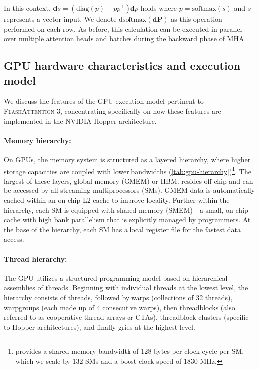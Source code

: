 \begin{enumerate}
In this context, $\mathbf{d}s = (\mathrm{diag}(p) - p p^\top)\mathbf{d}p$ holds where $p = \mathrm{softmax}(s)$ and $s$ represents a vector input. We denote $\mathrm{dsoftmax}(\mathbf{dP})$ as this operation performed on each row. As before, this calculation can be executed in parallel over multiple attention heads and batches during the backward phase of MHA.

\subsection{GPU hardware characteristics and execution model}
\label{subsec:hardware}

We discuss the features of the GPU execution model pertinent to \textsc{FlashAttention-3}, concentrating specifically on how these features are implemented in the NVIDIA Hopper architecture.

\paragraph{Memory hierarchy:} On GPUs, the memory system is structured as a layered hierarchy, where higher storage capacities are coupled with lower bandwidths (\cref{tab:gpu-hierarchy})\footnote{\citet{luo2024benchmarking} provides a shared memory bandwidth of 128 bytes per clock cycle per SM, which we scale by 132 SMs and a boost clock speed of 1830 MHz.}. The largest of these layers, global memory (GMEM) or HBM, resides off-chip and can be accessed by all streaming multiprocessors (SMs). GMEM data is automatically cached within an on-chip L2 cache to improve locality. Further within the hierarchy, each SM is equipped with shared memory (SMEM)—a small, on-chip cache with high bank parallelism that is explicitly managed by programmers. At the base of the hierarchy, each SM has a local register file for the fastest data access.

\paragraph{Thread hierarchy:} The GPU utilizes a structured programming model based on hierarchical assemblies of threads. Beginning with individual threads at the lowest level, the hierarchy consists of threads, followed by warps (collections of 32 threads), warpgroups (each made up of 4 consecutive warps), then threadblocks (also referred to as cooperative thread arrays or CTAs), threadblock clusters (specific to Hopper architectures), and finally grids at the highest level.


\end{enumerate}
